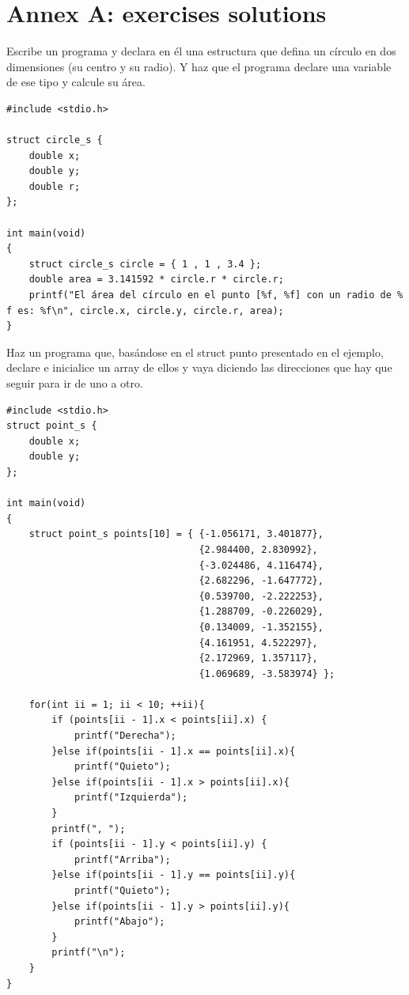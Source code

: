 \documentclass[a4paper]{article}
\begin{document}
\section{Annex A: exercises solutions}
\begin{exercises}
\item Escribe un programa y declara en él una estructura que defina un círculo
en dos dimensiones (su centro y su radio). Y haz que el programa declare una
variable de ese tipo y calcule su área.


\noindent
\begin{minipage}[H]{\linewidth}
\mbox{}
\begin{lstlisting}[style=C,
caption={Solución al ejercicio 1},
label={lst:solution1}]
#include <stdio.h>

struct circle_s {
    double x;
    double y;
    double r;
};

int main(void)
{
    struct circle_s circle = { 1 , 1 , 3.4 };
    double area = 3.141592 * circle.r * circle.r;
    printf("El área del círculo en el punto [%f, %f] con un radio de % f es: %f\n", circle.x, circle.y, circle.r, area);
}
\end{lstlisting}
\end{minipage}

\item Haz un programa que, basándose en el struct punto presentado en el
ejemplo, declare e inicialice un array de ellos y vaya diciendo las direcciones
que hay que seguir para ir de uno a otro.


\noindent
\begin{minipage}[H]{\linewidth}
\mbox{}
\begin{lstlisting}[style=C,
caption={Solución al ejercicio 2},
label={lst:solution2}]
#include <stdio.h>
struct point_s {
    double x;
    double y;
};

int main(void)
{
    struct point_s points[10] = { {-1.056171, 3.401877},
                                  {2.984400, 2.830992},
                                  {-3.024486, 4.116474},
                                  {2.682296, -1.647772},
                                  {0.539700, -2.222253},
                                  {1.288709, -0.226029},
                                  {0.134009, -1.352155},
                                  {4.161951, 4.522297},
                                  {2.172969, 1.357117},
                                  {1.069689, -3.583974} };

    for(int ii = 1; ii < 10; ++ii){
        if (points[ii - 1].x < points[ii].x) {
            printf("Derecha");
        }else if(points[ii - 1].x == points[ii].x){
            printf("Quieto");
        }else if(points[ii - 1].x > points[ii].x){
            printf("Izquierda");
        }
        printf(", ");
        if (points[ii - 1].y < points[ii].y) {
            printf("Arriba");
        }else if(points[ii - 1].y == points[ii].y){
            printf("Quieto");
        }else if(points[ii - 1].y > points[ii].y){
            printf("Abajo");
        }
        printf("\n");
    }
}
\end{lstlisting}
\end{minipage}


\end{exercises}
\end{document}
